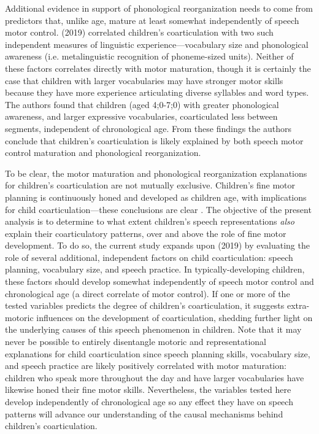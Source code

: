 \documentclass[a4paper,man,natbib,donotrepeattitle, apacite]{apa6}
\begin{document}
Additional evidence in support of phonological reorganization needs to come from predictors that, unlike age, mature at least somewhat independently of speech motor control. \citeauthor{noiraySpokenLanguageDevelopment2019} (2019) correlated children’s coarticulation with two such independent measures of linguistic experience---vocabulary size and phonological awareness (i.e. metalinguistic recognition of phoneme-sized units). Neither of these factors correlates directly with motor maturation, though it is certainly the case that children with larger vocabularies may have stronger motor skills because they have more experience articulating diverse syllables and word types. The authors found that children (aged 4;0-7;0)  with greater phonological awareness, and larger expressive vocabularies, coarticulated less between segments, independent of chronological age. From these findings the authors conclude that children’s coarticulation is likely explained by both speech motor control maturation and phonological reorganization. 

To be clear, the motor maturation and phonological reorganization explanations for children’s coarticulation are not mutually exclusive. Children’s fine motor planning is continuously honed and developed as children age, with implications for child coarticulation---these conclusions are clear \cite{barbierWhatAnticipatoryCoarticulation2020,rubertusDevelopmentGesturalOrganization2018,zharkovaDynamicsVoicelessSibilant2018}. The objective of the present analysis is to determine to what extent children’s speech representations \textit{also} explain their coarticulatory patterns, over and above the role of fine motor development. To do so, the current study expands upon \citeauthor{noiraySpokenLanguageDevelopment2019} (2019) by evaluating the role of several additional, independent factors on child coarticulation: speech planning, vocabulary size, and speech practice. In typically-developing children, these factors should develop somewhat independently of speech motor control and chronological age (a direct correlate of motor control). If one or more of the tested variables predicts the degree of children’s coarticulation, it suggests extra-motoric influences on the development of coarticulation, shedding further light on the underlying causes of this speech phenomenon in children. Note that it may never be possible to entirely disentangle motoric and representational explanations for child coarticulation since speech planning skills, vocabulary size, and speech practice are likely positively correlated with motor maturation: children who speak more throughout the day and have larger vocabularies have likewise honed their fine motor skills. Nevertheless, the variables tested here develop independently of chronological age so any effect they have on speech patterns will advance our understanding of the causal mechanisms behind children's coarticulation. 
\end{document}
